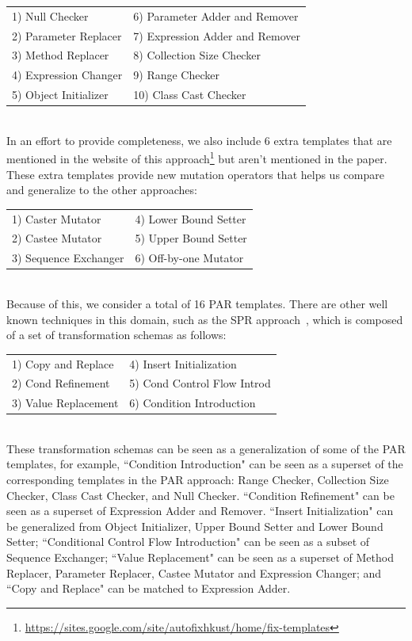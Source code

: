 \documentclass[conference]{IEEEtran}
\begin{document}
\begin{tabular}{K{3.3cm}K{5cm}}
1) Null Checker & 6) Parameter Adder and Remover \\ 
2) Parameter Replacer & 7) Expression Adder and Remover \\  
3) Method Replacer & 8) Collection Size Checker \\
4) Expression Changer & 9) Range Checker\\
5) Object Initializer & 10) Class Cast Checker\\
\end{tabular}\\
 
In an effort to provide completeness, we also include 6 extra templates that are 
mentioned in the website of this 
approach\footnote{\url{https://sites.google.com/site/autofixhkust/home/fix-templates}} 
but aren't mentioned in the paper\cite{kim2013}. These extra templates provide new mutation operators that helps us compare and generalize to the other approaches: 

\begin{tabular}{K{3.3cm}K{5cm}}
1) Caster Mutator & 4) Lower Bound Setter  \\
2) Castee Mutator & 5) Upper Bound Setter  \\
3) Sequence Exchanger & 6) Off-by-one Mutator\\
\end{tabular}\\

Because of this, we consider a total of 16 PAR templates. There are other well known techniques in this domain, such as the SPR 
approach~\cite{fan15}, which is composed of a set of transformation schemas as 
follows:

\begin{tabular}{K{3.3cm}K{5cm}}
1) Copy and Replace & 4) Insert Initialization \\
2) Cond Refinement & 5) Cond Control Flow Introd  \\
3) Value Replacement  & 6) Condition Introduction 
\end{tabular}
\\

These transformation schemas can be seen as a generalization of some of the PAR 
templates, for example, ``Condition Introduction" can be seen as a superset of 
the corresponding templates in the PAR approach: Range Checker, Collection Size 
Checker, Class Cast Checker, and Null Checker. ``Condition Refinement" can be 
seen as a superset of 
Expression Adder and Remover. ``Insert Initialization" can be 
generalized from Object Initializer, Upper Bound Setter and Lower Bound Setter; ``Conditional Control Flow Introduction" can be 
seen as a subset of Sequence Exchanger;
``Value Replacement" can be seen as a superset of Method 
Replacer, Parameter Replacer, Castee Mutator and Expression Changer; and ``Copy 
and Replace" can be matched to Expression Adder. 
\end{document}
